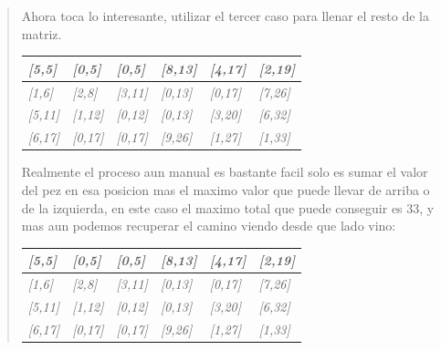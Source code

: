 \begin{quote}
    Ahora toca lo interesante, utilizar el tercer caso para llenar el resto de la matriz. \vspace{.2cm}

    \begin{table}[H]
        \centering
        \begin{tabular}{|l|l|l|l|l|l|}
            \hline
            \textit{[5,5]}  & \textit{[0,5]}  & \textit{[0,5]}  & \textit{[8,13]}                         & \textit{[4,17]}                         & \textit{[2,19]}                         \\ \hline
            \textit{[1,6]}  & \textit{[2,8]}  & \textit{[3,11]} & \textit{[0,13]}                         & \textit{[0,17]}                         & \textit{[7,26]}                         \\ \hline
            \textit{[5,11]} & \textit{[1,12]} & \textit{[0,12]} & \textit{[0,13]}                         & \textit{[3,20]}                         & \textit{[6,32]}                         \\ \hline
            \textit{[6,17]} & \textit{[0,17]} & \textit{[0,17]} & \cellcolor[HTML]{FFFFFF}\textit{[9,26]} & \cellcolor[HTML]{FFFFFF}\textit{[1,27]} & \cellcolor[HTML]{FFFFFF}\textit{[1,33]} \\ \hline
            \end{tabular}
    \end{table}

    Realmente el proceso aun manual es bastante facil solo es sumar el valor del pez en esa posicion mas el maximo valor que puede llevar de arriba o de la izquierda, en este caso el maximo total que puede conseguir es 33, y mas aun podemos recuperar el camino viendo desde que lado vino: \vspace{.2cm}

    \begin{table}[H]
        \centering
        \begin{tabular}{|l|l|l|l|l|l|}
            \hline
            \rowcolor[HTML]{FFFC9E} 
            \textit{[5,5]}  & \textit{[0,5]}  & \textit{[0,5]}  & \textit{[8,13]}                         & \textit{[4,17]}                         & \textit{[2,19]}                         \\ \hline
            \textit{[1,6]}  & \textit{[2,8]}  & \textit{[3,11]} & \textit{[0,13]}                         & \textit{[0,17]}                         & \cellcolor[HTML]{FFFC9E}\textit{[7,26]} \\ \hline
            \textit{[5,11]} & \textit{[1,12]} & \textit{[0,12]} & \textit{[0,13]}                         & \textit{[3,20]}                         & \cellcolor[HTML]{FFFC9E}\textit{[6,32]} \\ \hline
            \textit{[6,17]} & \textit{[0,17]} & \textit{[0,17]} & \cellcolor[HTML]{FFFFFF}\textit{[9,26]} & \cellcolor[HTML]{FFFFFF}\textit{[1,27]} & \cellcolor[HTML]{FFFC9E}\textit{[1,33]} \\ \hline
        \end{tabular}
    \end{table}


\end{quote}
